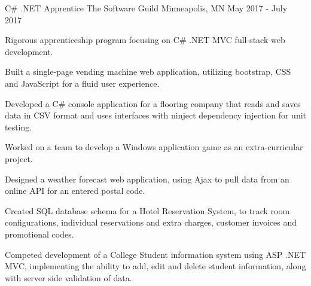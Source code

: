 \begin{cventries}
  \cventry
    {C\# .NET Apprentice}
    {The Software Guild}
    {Minneapolis, MN}
    {May 2017 - July 2017}
    {
      \begin{cvitems}
       \item {Rigorous apprenticeship program focusing on C\# .NET MVC full-stack web development.}
       \item {Built a single-page vending machine web application, utilizing bootstrap, CSS and JavaScript for a fluid user experience.}
       \item {Developed a C\# console application for a flooring company that reads and saves data in CSV format and uses interfaces with ninject dependency injection for unit testing.}
       \item {Worked on a team to develop a Windows application game as an extra-curricular project.}
       \item {Designed a weather forecast web application, using Ajax to pull data from an online API for an entered postal code.}
	\item {Created SQL database schema for a Hotel Reservation System, to track room configurations, individual reservations and extra charges, customer invoices and promotional codes.}
	\item {Competed development of a College Student information system using ASP .NET MVC, implementing the ability to add, edit and delete student information, along with server side validation of data.}
      \end{cvitems}
    }{}{}



\end{cventries}

